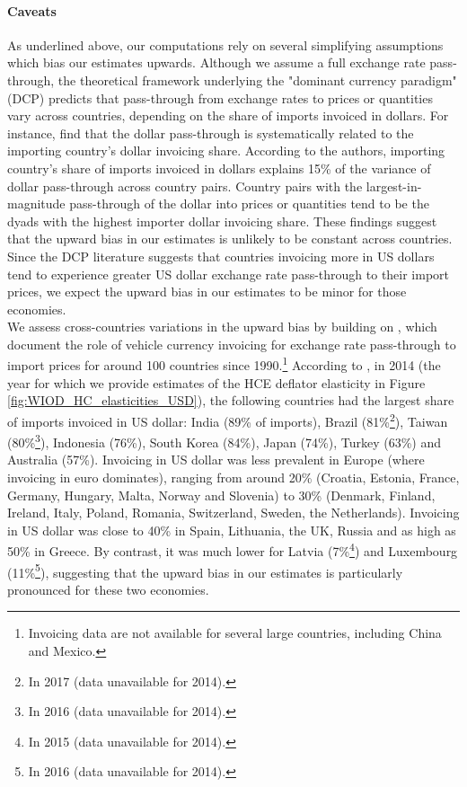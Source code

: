 \documentclass[11pt,a4paper]{paper} %
\begin{document}
\paragraph{Caveats}
As underlined above, our computations rely on several simplifying assumptions which bias our estimates upwards. 
Although we assume a full exchange rate pass-through, the theoretical framework underlying the "dominant currency paradigm" (DCP) predicts that pass-through from exchange rates to prices or quantities vary across countries, depending on the share of imports invoiced in dollars. 
For instance, \cite{Boz2019} find that the dollar pass-through is systematically related to the importing country’s dollar invoicing share.
According to the authors, importing country’s share of imports invoiced in dollars explains 15\% of the variance of dollar pass-through across country pairs. 
Country pairs with the largest-in-magnitude pass-through of the dollar into prices or quantities tend to be the dyads with the highest importer dollar invoicing share.
These findings suggest that the upward bias in our estimates is unlikely to be constant across countries. 
Since the DCP literature suggests that countries invoicing more in US dollars tend to experience greater US dollar exchange rate pass-through to their import prices, we expect the upward bias in our estimates to be minor for those economies.\\
We assess cross-countries variations in the upward bias by building on \cite{Boz2020}, which document the role of vehicle currency invoicing for exchange rate pass-through to import prices for around 100 countries since 1990.\footnote{Invoicing data are not available for several large countries, including China and Mexico.}
According to \cite{Boz2020}, in 2014 (the year for which we provide estimates of the HCE deflator elasticity in Figure \ref{fig:WIOD_HC_elasticities_USD}), the following countries had the largest share of imports invoiced in US dollar: India (89\% of imports), Brazil (81\%\footnote{In 2017 (data unavailable for 2014).}), Taiwan (80\%\footnote{In 2016 (data unavailable for 2014).}), Indonesia (76\%), South Korea (84\%), Japan (74\%), Turkey (63\%) and Australia (57\%).
Invoicing in US dollar was less prevalent in Europe (where invoicing in euro dominates), ranging from around 20\% (Croatia, Estonia, France, Germany, Hungary, Malta, Norway and Slovenia) to 30\% (Denmark, Finland, Ireland, Italy, Poland, Romania, Switzerland, Sweden, the Netherlands). 
Invoicing in US dollar was close to 40\% in Spain, Lithuania, the UK, Russia and as high as 50\% in Greece. 
By contrast, it was much lower for Latvia (7\%\footnote{In 2015 (data unavailable for 2014).}) and Luxembourg (11\%\footnote{In 2016 (data unavailable for 2014).}), suggesting that the upward bias in our estimates is particularly pronounced for these two economies. 
\end{document}
